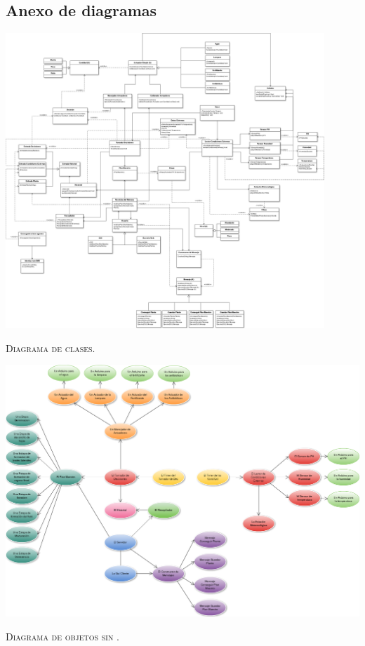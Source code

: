 \begin{landscape}
\section{Anexo de diagramas}

    \includegraphics[width=0.9\textwidth]{img/clases.png}
    \centerline{ \small \scshape Diagrama de clases.}

    \hfill

    \includegraphics[width=1.2\textwidth]{img/objetosGeneral.png}
    \centerline{ \small \scshape Diagrama de objetos sin \historial{}.}

    \hfill


\end{landscape}
